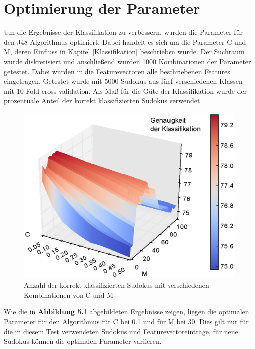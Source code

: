 \section{Optimierung der Parameter}
\label{Parameteroptimierung}
Um die Ergebnisse der Klassifikation zu verbessern, wurden die Parameter für den J48 Algorithmus optimiert. Dabei handelt es sich um die Parameter C und M, deren Einfluss in Kapitel \ref{Klassifikation} beschrieben wurde. Der Suchraum wurde diskretisiert und anschließend wurden 1000 Kombinationen der Parameter getestet. Dabei wurden in die Featurevectoren alle beschriebenen Features eingetragen. Getestet wurde mit 5000 Sudokus aus fünf verschiedenen Klassen mit 10-Fold cross validation. Als Maß für die Güte der Klassifikation wurde der prozentuale Anteil der korrekt klassifizierten Sudokus verwendet.\\

\begin{figure}[H]
    \includegraphics[scale=0.9]{./img/parameter.eps}
    \caption{Anzahl der korrekt klassifizierten Sudokus mit verschiedenen Kombinationen von C und M}
\end{figure}

\noindent Wie die in \textbf{Abbildung 5.1} abgebildeten Ergebnisse zeigen, liegen die optimalen Parameter für den Algorithmus für C bei 0.1 und für M bei 30. Dies gilt nur für die in diesem Test verwendeten Sudokus und Featurevectoreinträge, für neue Sudokus können die optimalen Parameter variieren.